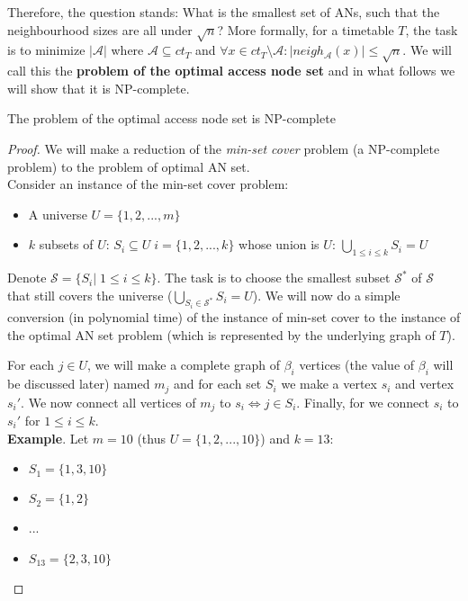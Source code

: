 		Therefore, the question stands: What is the smallest set of ANs, such that the neighbourhood sizes are all under $\sqrt{n}$? More formally, for a timetable $T$, the task is to minimize $|\mathcal{A}|$ where $\mathcal{A} \subseteq ct_{T}$ and $\forall x \in ct_{T} \setminus \mathcal{A}: |neigh_{\mathcal{A}}(x)| \leq \sqrt{n}$. We will call this the \textbf{problem of the optimal access node set} and in what follows we will show that it is NP-complete.
		
		\begin{theorem}
			The problem of the optimal access node set is NP-complete
		\end{theorem}
		
		\begin{proof}
			We will make a reduction of the \textit{min-set cover} problem (a NP-complete problem) to the problem of optimal AN set. \\
			
			\noindent Consider an instance of the min-set cover problem:
			\begin{itemize}
				\item A universe $U = \{1, 2, ..., m\}$
				\item $k$ subsets of $U$: $S_{i} \subseteq U \; i = \{1, 2, ..., k\}$ whose union is $U$: $\bigcup\limits_{1 \leq i \leq k} S_{i} = U$
			\end{itemize}
			\hspace*{\fill}
			
			\noindent Denote $\mathcal{S} = \{S_{i}| \; 1 \leq i \leq k\}$. The task is to choose the smallest subset $\mathcal{S}^{*}$ of $\mathcal{S}$ that still covers the universe ($\bigcup\limits_{S_{i} \in \mathcal{S}^{*}} S_{i} = U$). We will now do a simple conversion (in polynomial time) of the instance of min-set cover to the instance of the optimal AN set problem (which is represented by the underlying graph of $T$).
			
			 For each $j \in U$, we will make a complete graph of $\beta_{i}$ vertices (the value of $\beta_{i}$ will be discussed later) named $m_{j}$ and for each set $S_{i}$ we make a vertex $s_{i}$ and vertex $s_{i}'$. We now connect all vertices of $m_{j}$ to $s_{i} \iff j \in S_{i}$. Finally, for we connect $s_{i}$ to $s_{i}'$ for $1 \leq i \leq k$. \\
			 
			\noindent \textbf{Example}. Let $m = 10$ (thus $U = \{1, 2, ..., 10\}$) and $k = 13$:
			\begin{itemize}
				\item $S_{1} = \{1, 3, 10\}$
			 	\item $S_{2} = \{1, 2\}$
			 	\item ...
			 	\item $S_{13} = \{2, 3, 10\}$
			\end{itemize}
			\hspace*{\fill}
			 

\end{proof}
